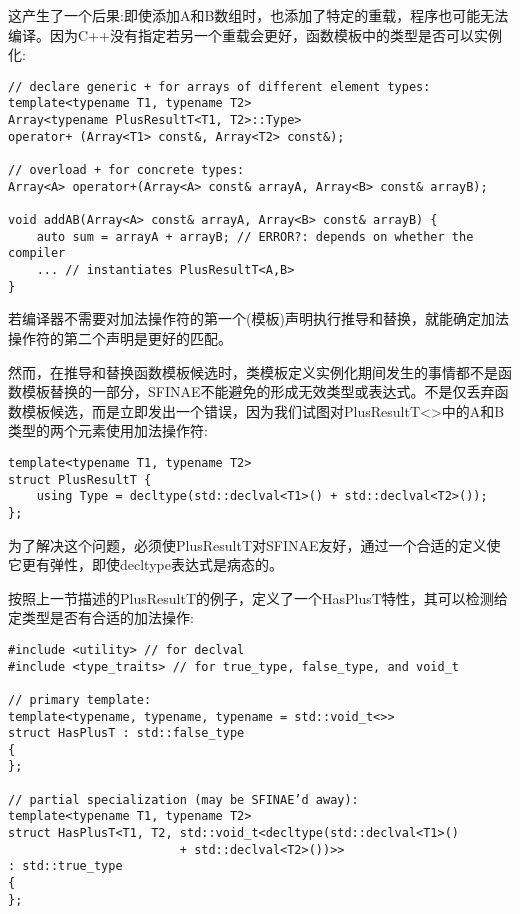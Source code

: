 这产生了一个后果:即使添加A和B数组时，也添加了特定的重载，程序也可能无法编译。因为C++没有指定若另一个重载会更好，函数模板中的类型是否可以实例化:

\begin{lstlisting}[style=styleCXX]
// declare generic + for arrays of different element types:
template<typename T1, typename T2>
Array<typename PlusResultT<T1, T2>::Type>
operator+ (Array<T1> const&, Array<T2> const&);

// overload + for concrete types:
Array<A> operator+(Array<A> const& arrayA, Array<B> const& arrayB);

void addAB(Array<A> const& arrayA, Array<B> const& arrayB) {
	auto sum = arrayA + arrayB; // ERROR?: depends on whether the compiler
	... // instantiates PlusResultT<A,B>
}
\end{lstlisting}

若编译器不需要对加法操作符的第一个(模板)声明执行推导和替换，就能确定加法操作符的第二个声明是更好的匹配。

然而，在推导和替换函数模板候选时，类模板定义实例化期间发生的事情都不是函数模板替换的一部分，SFINAE不能避免的形成无效类型或表达式。不是仅丢弃函数模板候选，而是立即发出一个错误，因为我们试图对PlusResultT<>中的A和B类型的两个元素使用加法操作符:

\begin{lstlisting}[style=styleCXX]
template<typename T1, typename T2>
struct PlusResultT {
	using Type = decltype(std::declval<T1>() + std::declval<T2>());
};
\end{lstlisting}

为了解决这个问题，必须使PlusResultT对SFINAE友好，通过一个合适的定义使它更有弹性，即使decltype表达式是病态的。

按照上一节描述的PlusResultT的例子，定义了一个HasPlusT特性，其可以检测给定类型是否有合适的加法操作:

\begin{lstlisting}[style=styleCXX]
#include <utility> // for declval
#include <type_traits> // for true_type, false_type, and void_t

// primary template:
template<typename, typename, typename = std::void_t<>>
struct HasPlusT : std::false_type
{
};

// partial specialization (may be SFINAE’d away):
template<typename T1, typename T2>
struct HasPlusT<T1, T2, std::void_t<decltype(std::declval<T1>()
						+ std::declval<T2>())>>
: std::true_type
{
};
\end{lstlisting}

